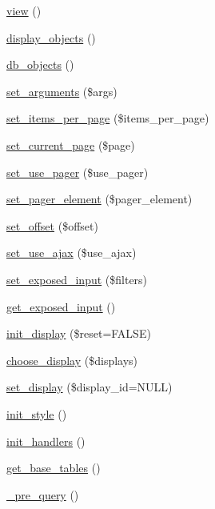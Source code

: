 \begin{CompactItemize}
\item 
\hyperlink{classview_26e74a2bf85d7af45346359134f9f85d}{view} ()
\item 
\hyperlink{classview_1338697759506981e17d1c4772b13aa6}{display\_\-objects} ()
\item 
\hyperlink{classview_7df52d46e3a8245e6d8f415133c31cad}{db\_\-objects} ()
\item 
\hyperlink{classview_3cc8de2cedfc558314c27ee8ca995235}{set\_\-arguments} (\$args)
\item 
\hyperlink{classview_d1f69acfdb3771ec2d6f54fdb7ed7e4c}{set\_\-items\_\-per\_\-page} (\$items\_\-per\_\-page)
\item 
\hyperlink{classview_421f000fc97fb8f7dda965cbdd285071}{set\_\-current\_\-page} (\$page)
\item 
\hyperlink{classview_d20caae0391d958137ed7d7c2e4e3750}{set\_\-use\_\-pager} (\$use\_\-pager)
\item 
\hyperlink{classview_516bd36d65179ed026f565e229f3d676}{set\_\-pager\_\-element} (\$pager\_\-element)
\item 
\hyperlink{classview_e8156db948b1c7efaeeebd72148147f5}{set\_\-offset} (\$offset)
\item 
\hyperlink{classview_77bfc90f75fc5bdbf34cb7f7678c4840}{set\_\-use\_\-ajax} (\$use\_\-ajax)
\item 
\hyperlink{classview_be2340e413d0ef7a6dfeba37f09fc88c}{set\_\-exposed\_\-input} (\$filters)
\item 
\hyperlink{classview_c89e7aa08b258bc09d8e6209c6ebcfc2}{get\_\-exposed\_\-input} ()
\item 
\hyperlink{classview_5d314e75f3ebe2c46988e9b0c6b9b3b4}{init\_\-display} (\$reset=FALSE)
\item 
\hyperlink{classview_66ba9a9554f6f5fc3e2ee54e448b6f32}{choose\_\-display} (\$displays)
\item 
\hyperlink{classview_afb326696e2de96d2012882b5275c54c}{set\_\-display} (\$display\_\-id=NULL)
\item 
\hyperlink{classview_22ea4e41e69fadff64193a54a63a24e9}{init\_\-style} ()
\item 
\hyperlink{classview_8f0b3dc5e14f0d96d37af0050b83ee6b}{init\_\-handlers} ()
\item 
\hyperlink{classview_e938f5f192743bc0a231e21f60b37383}{get\_\-base\_\-tables} ()
\item 
\hyperlink{classview_882fc1813823b4fa361748edaae121ee}{\_\-pre\_\-query} ()
\item 

\end{CompactItemize}

